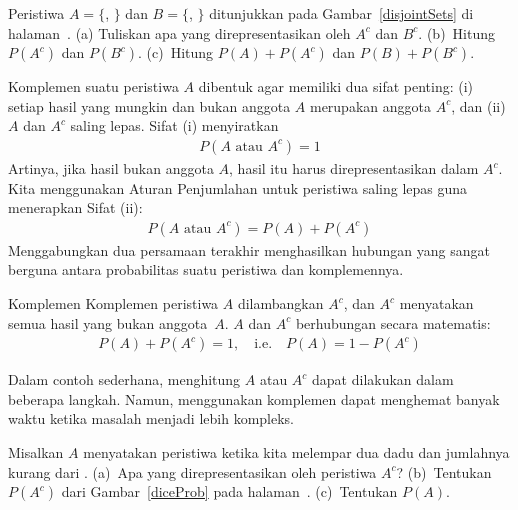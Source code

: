\begin{exercisewrap}
\begin{nexercise}
Peristiwa $A=\{$, $\}$ dan $B=\{$, $\}$ ditunjukkan pada Gambar~\ref{disjointSets} di halaman~\pageref{disjointSets}. (a) Tuliskan apa yang direpresentasikan oleh $A^c$ dan $B^c$. (b)~Hitung $P(A^c)$ dan $P(B^c)$. (c)~Hitung $P(A)+P(A^c)$ dan $P(B)+P(B^c)$.\footnotemark
\end{nexercise}
\end{exercisewrap}

\D{\newpage}

Komplemen suatu peristiwa $A$ dibentuk agar memiliki dua sifat penting: (i) setiap hasil yang mungkin dan bukan anggota $A$ merupakan anggota $A^c$, dan (ii) $A$ dan $A^c$ saling lepas. Sifat (i) menyiratkan
\begin{align*}
P(A\text{ atau }A^c) = 1
\end{align*}
Artinya, jika hasil bukan anggota $A$, hasil itu harus direpresentasikan dalam $A^c$. Kita menggunakan Aturan Penjumlahan untuk peristiwa saling lepas guna menerapkan Sifat (ii):
\begin{align*}
P(A\text{ atau }A^c) = P(A) + P(A^c)
\end{align*}
Menggabungkan dua persamaan terakhir menghasilkan hubungan yang sangat berguna antara probabilitas suatu peristiwa dan komplemennya.

\begin{onebox}{Komplemen}
  Komplemen peristiwa $A$ dilambangkan $A^c$, dan $A^c$
  menyatakan semua hasil yang bukan anggota~$A$. $A$ dan $A^c$
  berhubungan secara matematis:
  \begin{align*}
  P(A) + P(A^c) = 1, \quad\text{i.e.}\quad P(A) = 1-P(A^c)
  \end{align*}
\end{onebox}

Dalam contoh sederhana, menghitung $A$ atau $A^c$ dapat dilakukan dalam beberapa langkah. Namun, menggunakan komplemen dapat menghemat banyak waktu ketika masalah menjadi lebih kompleks.

\begin{exercisewrap}
\begin{nexercise}
Misalkan $A$ menyatakan peristiwa ketika kita melempar dua dadu dan jumlahnya kurang dari . (a)~Apa yang direpresentasikan oleh peristiwa $A^c$? (b)~Tentukan $P(A^c)$ dari Gambar~\ref{diceProb} pada halaman~\pageref{diceProb}. (c)~Tentukan $P(A)$.\footnotemark
\end{nexercise}
\end{exercisewrap}

